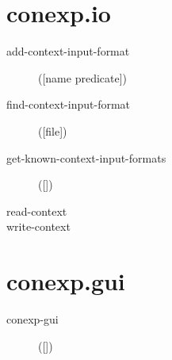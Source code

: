 \section{conexp.io}
\begin{description}
  \item[add-context-input-format]
([name predicate])



  \item[find-context-input-format]
([file])



  \item[get-known-context-input-formats]
([])



  \item[read-context]




  \item[write-context]




\end{description}

\section{conexp.gui}
\begin{description}
  \item[conexp-gui]
([])



\end{description}

